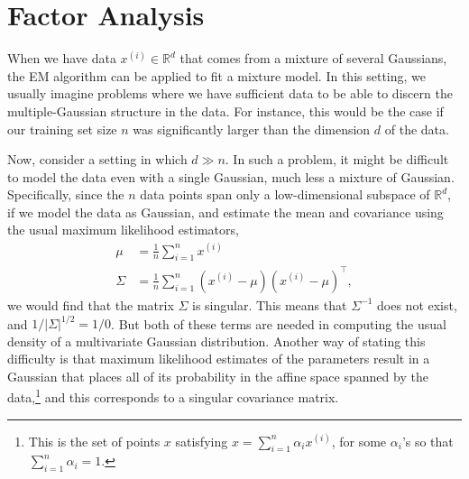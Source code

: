 \titlespacing*{\part}{0pt}{-20pt}{30pt} %
\titlespacing*{\chapter}{0pt}{-10pt}{30pt}

\part{Factor Analysis}
\label{part:factor_analysis}


When we have data $x^{(i)} \in \mathbb R^d$
that comes from a mixture of several Gaussians,
the EM algorithm can be applied to fit a mixture model. In this setting, we
usually imagine problems where we have sufficient data to be able to discern
the multiple-Gaussian structure in the data. For instance, this would be the
case if our training set size $n$ was significantly larger than the dimension $d$
of the data.

Now, consider a setting in which $d \gg n$. In such a problem, it might be
difficult to model the data even with a single Gaussian, much less a mixture
of Gaussian. Specifically, since the $n$ data points span only a low-dimensional
subspace of $\mathbb R^d$, if we model the data as Gaussian, and estimate the mean
and covariance using the usual maximum likelihood estimators,
\begin{align*}
    \mu &= \frac 1 n \sum^n_{i=1} x^{(i)}\\
    \Sigma &= \frac 1 n \sum^n_{i=1} (x^{(i)} - \mu)(x^{(i)} - \mu)^\top,
\end{align*}
we would find that the matrix $\Sigma$ is singular. This means that $\Sigma^{-1}$ does not
exist, and $1/|\Sigma|^{1/2} = 1/0$. But both of these terms are needed in computing
the usual density of a multivariate Gaussian distribution. Another way of
stating this difficulty is that maximum likelihood estimates of the parameters
result in a Gaussian that places all of its probability in the affine space
spanned by the data,\footnote{This is the set of points $x$ satisfying $x = \sum^n_{i=1} \alpha_i x^{(i)}$, for some $\alpha_i$'s so that $\sum^n_{i=1} \alpha_i = 1$.} %
and this corresponds to a singular covariance matrix.

